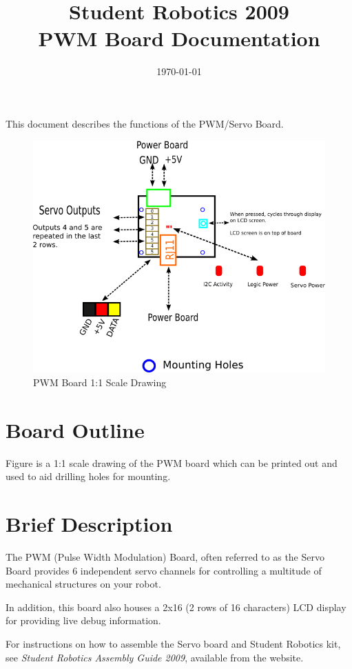 \documentclass[a4paper, 12pt]{article}
\title {Student Robotics 2009\\ PWM Board Documentation}
\date{\today}
\begin{document}
\maketitle

\noindent This document describes the functions of the PWM/Servo Board. 

\begin{figure}
\centering
\includegraphics[scale=1, angle=90]{outline}
\caption{PWM Board 1:1 Scale Drawing}
\label{fig:outline}
\end{figure}


\section{Board Outline}
Figure \label{fig:outline} is a 1:1 scale drawing of the PWM board which can be printed out and used to aid drilling holes for mounting.
\label{sec:outline}

\section{Brief Description}

The PWM (Pulse Width Modulation) Board, often referred to as the Servo Board provides 6 independent servo channels for controlling a multitude of mechanical structures on your robot. 

In addition, this board also houses a 2x16 (2 rows of 16 characters) LCD display for providing live debug information.


For instructions on how to assemble the Servo board and Student Robotics kit, see \textit{Student Robotics Assembly Guide 2009}, available from the website.
\end{document}
